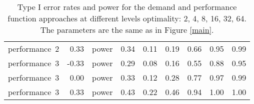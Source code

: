 \begin{table}[ht]
\begin{tabular}{lrlrrrrrr}
  performance~2 & 0.33 & power & 0.34 & 0.11 & 0.19 & 0.66 & 0.95 & 0.99 \\ 
  performance~3 & -0.33 & power & 0.29 & 0.08 & 0.16 & 0.55 & 0.88 & 0.95 \\ 
  performance~3 & 0.00 & power & 0.33 & 0.12 & 0.28 & 0.77 & 0.97 & 0.99 \\ 
  performance~3 & 0.33 & power & 0.43 & 0.22 & 0.46 & 0.94 & 1.00 & 1.00 \\ 
   \hline
\end{tabular}
\endgroup
\caption{Type I error rates and power for the demand and
             performance function approaches at different levels optimality:
             2, 4, 8, 16, 32, 64. The parameters are the same as in Figure
             \ref{main}.} 
\label{main-table}
\end{table}
